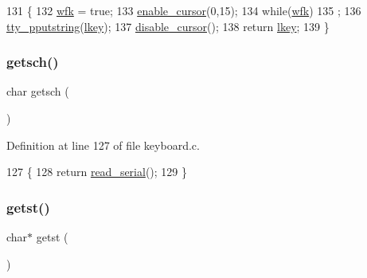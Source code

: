 \begin{DoxyCode}
131              \{
132     \hyperlink{a00038_a6ddd5223379778858edc46ffbec19775_a6ddd5223379778858edc46ffbec19775}{wfk} = \textcolor{keyword}{true};
133     \hyperlink{a00179_afe197dc4dbfa6036ef04abd2aeeeca2d_afe197dc4dbfa6036ef04abd2aeeeca2d}{enable\_cursor}(0,15);
134     \textcolor{keywordflow}{while}(\hyperlink{a00038_a6ddd5223379778858edc46ffbec19775_a6ddd5223379778858edc46ffbec19775}{wfk})
135         ;
136     \hyperlink{a00179_ade960b1320324706aac6c00cc6b1b2fe_ade960b1320324706aac6c00cc6b1b2fe}{tty\_pputstring}(\hyperlink{a00038_ade374650022cb30c4f5591a8dafad685_ade374650022cb30c4f5591a8dafad685}{lkey});
137     \hyperlink{a00179_a3d09038c7b6436e60b228f2f3f451f6a_a3d09038c7b6436e60b228f2f3f451f6a}{disable\_cursor}();
138     \textcolor{keywordflow}{return} \hyperlink{a00038_ade374650022cb30c4f5591a8dafad685_ade374650022cb30c4f5591a8dafad685}{lkey};
139 \}
\end{DoxyCode}
\mbox{\label{a00041_aa7ee03b27a489828ce588d0fc023cab3_aa7ee03b27a489828ce588d0fc023cab3}} 
\subsubsection{\texorpdfstring{getsch()}{getsch()}}
{\footnotesize\ttfamily char getsch (\begin{DoxyParamCaption}{ }\end{DoxyParamCaption})}



Definition at line 127 of file keyboard.\+c.


\begin{DoxyCode}
127               \{
128     \textcolor{keywordflow}{return} \hyperlink{a00056_ad343a7018f74662f794968dfa0523841_ad343a7018f74662f794968dfa0523841}{read\_serial}();
129 \}
\end{DoxyCode}
\mbox{\label{a00041_ab88a2e96bbe585e228a5b201435c0240_ab88a2e96bbe585e228a5b201435c0240}} 
\subsubsection{\texorpdfstring{getst()}{getst()}}
{\footnotesize\ttfamily char$\ast$ getst (\begin{DoxyParamCaption}{ }\end{DoxyParamCaption})}



